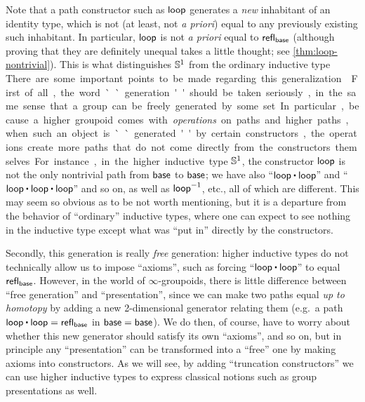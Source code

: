Note that a path constructor such as $\mathsf{loop}$ generates a \emph{new} inhabitant of an identity type, which is not (at least, not \emph{a priori}) equal to any previously existing such inhabitant.
In particular, $\mathsf{loop}$ is not \emph{a priori} equal to $\mathsf{refl}_{\mathsf{base}}$ (although proving that they are definitely unequal takes a little thought; see \autoref{thm:loop-nontrivial}).
This is what distinguishes $\mathbb{S}^1$ from the ordinary inductive type \unit.

There are some important points to be made regarding this generalization.

%
First of all, the word ``generation'' should be taken seriously, in the same sense that a group can be freely generated by some set.
In particular, because a higher groupoid comes with \emph{operations} on paths and higher paths, when such an object is ``generated'' by certain constructors, the operations create more paths that do not come directly from the constructors themselves.
For instance, in the higher inductive type $\mathbb{S}^1$, the constructor $\mathsf{loop}$ is not the only nontrivial path from $\mathsf{base}$ to $\mathsf{base}$; we have also ``$\lloop\ct\lloop$'' and ``$\lloop\ct\lloop\ct\lloop$'' and so on, as well as $\mathord{{\mathsf{loop}}^{-1}}$, etc., all of which are different.
This may seem so obvious as to be not worth mentioning, but it is a departure from the behavior of ``ordinary'' inductive types, where one can expect to see nothing in the inductive type except what was ``put in'' directly by the constructors.

Secondly, this generation is really \emph{free} generation: higher inductive types do not technically allow us to impose ``axioms'', such as forcing ``$\lloop\ct\lloop$'' to equal $\mathsf{refl}_{\mathsf{base}}$.
However, in the world of $\infty$-groupoids,%
there is little difference between ``free generation'' and ``presentation'',
%
%
since we can make two paths equal \emph{up to homotopy} by adding a new 2-di\-men\-sion\-al generator relating them (e.g.\ a path $\lloop\ct\lloop = \refl{\base}$ in $\mathsf{base}=\mathsf{base}$).
We do then, of course, have to worry about whether this new generator should satisfy its own ``axioms'', and so on, but in principle any ``presentation'' can be transformed into a ``free'' one by making axioms into constructors.
As we will see, by adding ``truncation constructors'' we can use higher inductive types to express classical notions such as group presentations as well.

